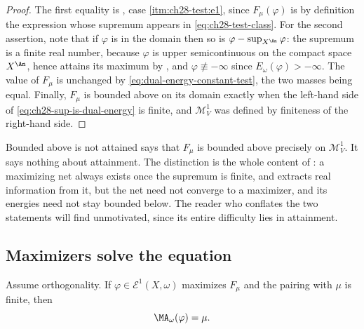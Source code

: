 \begin{proof}
The first equality is , case
\cref{itm:ch28-test:e1}, since \(F_\mu(\varphi)\) is by definition the
expression whose supremum appears in \eqref{eq:ch28-test-class}.  For the
second assertion, note that if \(\varphi\) is in the domain then so is
\(\varphi-\sup_{X^{\An}}\varphi\): the supremum is a finite real number,
because \(\varphi\) is upper semicontinuous on the compact space
\(X^{\An}\), hence attains its maximum by , and
\(\varphi\not\equiv-\infty\) since \(E_\omega(\varphi)>-\infty\).  The value
of \(F_\mu\) is unchanged by \eqref{eq:dual-energy-constant-test}, the two
masses being equal.  Finally, \(F_\mu\) is bounded above on its domain
exactly when the left-hand side of \eqref{eq:ch28-sup-is-dual-energy} is
finite, and \(\mathcal M^1_V\) was defined by finiteness of the right-hand
side.
\end{proof}

\begin{warning}{Bounded above is not attained}
 says that \(F_\mu\) is bounded above
precisely on \(\mathcal M^1_V\).  It says nothing about attainment.  The
distinction is the whole content of : a maximizing
net always exists once the supremum is finite, and
 extracts real information from
it, but the net need not converge to a maximizer, and its energies need not
stay bounded below.  The reader who conflates the two statements will find
 unmotivated, since its entire difficulty lies in
attainment.
\end{warning}

\subsection{Maximizers solve the equation}
\label{sec:ch28-maximizers-solve}

\begin{proposition}
\label{prop:variational-maximizer-solves}
Assume orthogonality.  If \(\varphi\in\mathcal E^1(X,\omega)\) maximizes
\(F_\mu\) and the pairing with \(\mu\) is finite, then
\begin{equation}
\label{eq:variational-ma-equation}
                         \MA_\omega(\varphi)=\mu.
\end{equation}
\end{proposition}

